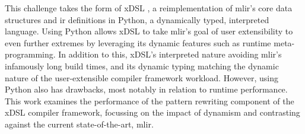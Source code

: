 
This challenge takes the form of xDSL \cite{fehrXDSLSidekickCompilation2025}, a reimplementation of \ac{mlir}'s core data structures and \ac{ir} definitions in Python, a dynamically typed, interpreted language.
Using Python allows xDSL to take \ac{mlir}'s goal of user extensibility to even further extremes by leveraging its dynamic features such as runtime meta-programming.
In addition to this, xDSL's interpreted nature avoiding \ac{mlir}'s infamously long build times, and its dynamic typing matching the dynamic nature of the user-extensible compiler framework workload.
However, using Python also has drawbacks, most notably in relation to runtime performance.
This work examines the performance of the pattern rewriting component of the xDSL compiler framework, focussing on the impact of dynamism and contrasting against the current state-of-the-art, \ac{mlir}.







